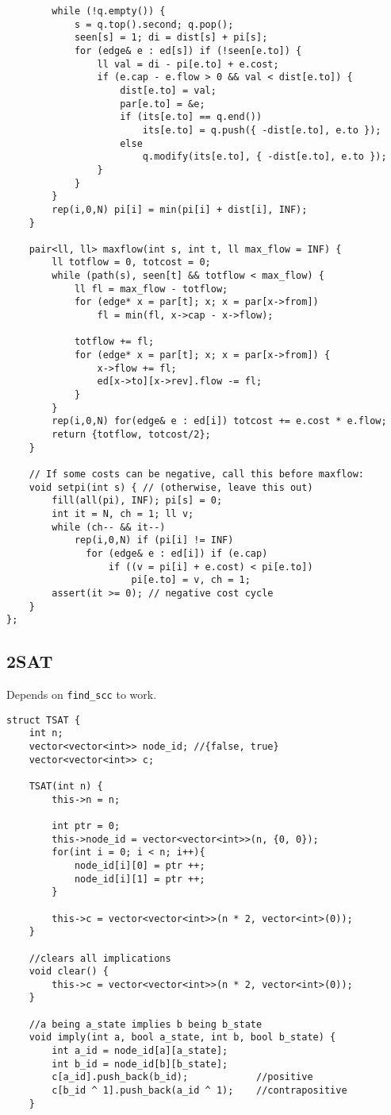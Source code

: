 \documentclass[8pt, headheight=10pt]{scrartcl}
\begin{document}
\begin{multicols*}{3}
\begin{lstlisting}
		while (!q.empty()) {
			s = q.top().second; q.pop();
			seen[s] = 1; di = dist[s] + pi[s];
			for (edge& e : ed[s]) if (!seen[e.to]) {
				ll val = di - pi[e.to] + e.cost;
				if (e.cap - e.flow > 0 && val < dist[e.to]) {
					dist[e.to] = val;
					par[e.to] = &e;
					if (its[e.to] == q.end())
						its[e.to] = q.push({ -dist[e.to], e.to });
					else
						q.modify(its[e.to], { -dist[e.to], e.to });
				}
			}
		}
		rep(i,0,N) pi[i] = min(pi[i] + dist[i], INF);
	}
    
	pair<ll, ll> maxflow(int s, int t, ll max_flow = INF) {
		ll totflow = 0, totcost = 0;
		while (path(s), seen[t] && totflow < max_flow) {
			ll fl = max_flow - totflow;
			for (edge* x = par[t]; x; x = par[x->from])
				fl = min(fl, x->cap - x->flow);

			totflow += fl;
			for (edge* x = par[t]; x; x = par[x->from]) {
				x->flow += fl;
				ed[x->to][x->rev].flow -= fl;
			}
		}
		rep(i,0,N) for(edge& e : ed[i]) totcost += e.cost * e.flow;
		return {totflow, totcost/2};
	}

	// If some costs can be negative, call this before maxflow:
	void setpi(int s) { // (otherwise, leave this out)
		fill(all(pi), INF); pi[s] = 0;
		int it = N, ch = 1; ll v;
		while (ch-- && it--)
			rep(i,0,N) if (pi[i] != INF)
			  for (edge& e : ed[i]) if (e.cap)
				  if ((v = pi[i] + e.cost) < pi[e.to])
					  pi[e.to] = v, ch = 1;
		assert(it >= 0); // negative cost cycle
	}
};
\end{lstlisting}

\subsection{2SAT}
Depends on \lstinline{find_scc} to work. 
\begin{lstlisting}
struct TSAT {
    int n;
    vector<vector<int>> node_id; //{false, true}
    vector<vector<int>> c;

    TSAT(int n) {
        this->n = n;

        int ptr = 0;
        this->node_id = vector<vector<int>>(n, {0, 0});
        for(int i = 0; i < n; i++){
            node_id[i][0] = ptr ++;
            node_id[i][1] = ptr ++;
        }

        this->c = vector<vector<int>>(n * 2, vector<int>(0));
    }

    //clears all implications
    void clear() {
        this->c = vector<vector<int>>(n * 2, vector<int>(0));
    }

    //a being a_state implies b being b_state
    void imply(int a, bool a_state, int b, bool b_state) {
        int a_id = node_id[a][a_state];
        int b_id = node_id[b][b_state];
        c[a_id].push_back(b_id);            //positive
        c[b_id ^ 1].push_back(a_id ^ 1);    //contrapositive
    }


\end{lstlisting}
\end{multicols*}
\end{document}
